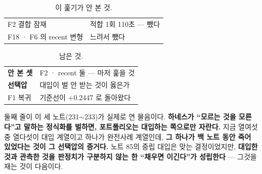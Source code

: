 \documentclass[10pt]{article}
\begin{document}

\begin{table}[t]
\centering\tsize
\caption{이 훑기가 안 본 것.}
\begin{tabular}{ll}
\toprule
F2 결합 잠재 & 적합 1회 110초 --- 뺐다 \\
F18 · F6 의 recent 변형 & 느려서 뺐다 \\
\bottomrule
\end{tabular}
\end{table}


\begin{table}[t]
\centering\tsize
\caption{남은 것.}
\begin{tabular}{ll}
\toprule
\textbf{안 본 셋} & F2 · recent 둘 --- 마저 훑을 것 \\
\textbf{선택압} & 대입이 벌 안 받는 것이 옳은가 \\
F1 복귀 & 기준선이 $+$0.2447 로 돌아왔다 \\
\bottomrule
\end{tabular}
\end{table}

둘째 줄이 이 세 노트(231$\sim$233)가 실제로 연 물음이다. \textbf{하네스가
``모르는 것을 모른다''고 말하는 정식화를 벌하면, 포트폴리오는 대입하는
쪽으로만 자란다.} 지금 열여섯 중 열다섯이 대입 계열이고 하나가 완전사례
계열인데, \textbf{그 하나가 백 노트 동안 죽어 있었다는 것이 그 선택압의
증거다.} 노트 85의 중립 대입은 맞는 결정이었지만, \textbf{대입한 것과
관측한 것을 판정치가 구분하지 않는 한 ``채우면 이긴다''가 성립한다} ---
그것을 재는 것이 다음이다.
\end{document}
